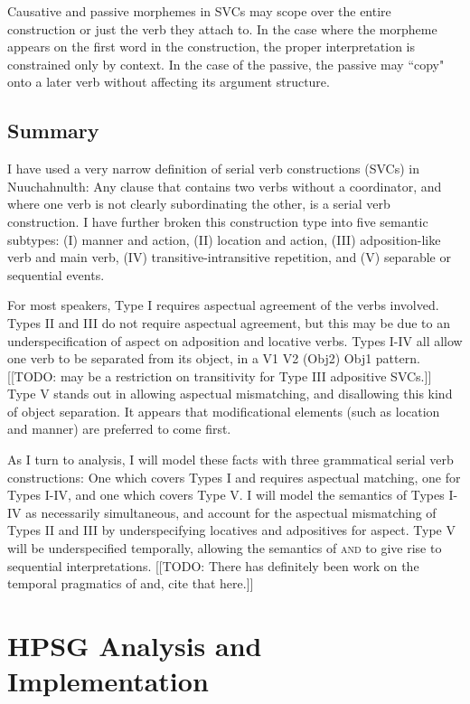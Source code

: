 Causative and passive morphemes in SVCs may scope over the entire construction or just the verb they attach to. In the case where the morpheme appears on the first word in the construction, the proper interpretation is constrained only by context. In the case of the passive, the passive may ``copy" onto a later verb without affecting its argument structure.

\subsection{Summary}

I have used a very narrow definition of serial verb constructions (SVCs) in Nuuchahnulth: Any clause that contains two verbs without a coordinator, and where one verb is not clearly subordinating the other, is a serial verb construction. I have further broken this construction type into five semantic subtypes: (I) manner and action, (II) location and action, (III) adposition-like verb and main verb, (IV) transitive-intransitive repetition, and (V) separable or sequential events.

For most speakers, Type I requires aspectual agreement of the verbs involved. Types II and III do not require aspectual agreement, but this may be due to an underspecification of aspect on adposition and locative verbs. Types I-IV all allow one verb to be separated from its object, in a V1 V2 (Obj2) Obj1 pattern. [[TODO: may be a restriction on transitivity for Type III adpositive SVCs.]] Type V stands out in allowing aspectual mismatching, and disallowing this kind of object separation. It appears that modificational elements (such as location and manner) are preferred to come first.

As I turn to analysis, I will model these facts with three grammatical serial verb constructions: One which covers Types I and requires aspectual matching, one for Types I-IV, and one which covers Type V. I will model the semantics of Types I-IV as necessarily simultaneous, and account for the aspectual mismatching of Types II and III by underspecifying locatives and adpositives for aspect. Type V will be underspecified temporally, allowing the semantics of \textsc{and} to give rise to sequential interpretations. [[TODO: There has definitely been work on the temporal pragmatics of and, cite that here.]]

\section{HPSG Analysis and Implementation} \label{ch:sv:analysis}